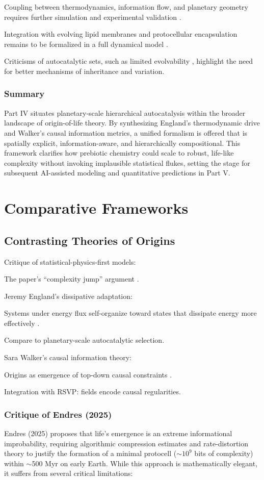 \documentclass{book}
\begin{document}
Coupling between thermodynamics, information flow, and planetary geometry requires further simulation and experimental validation \citep{plum2025}.

Integration with evolving lipid membranes and protocellular encapsulation remains to be formalized in a full dynamical model \citep{deamer2017}.

Criticisms of autocatalytic sets, such as limited evolvability \citep{vasas2010, lifson1997}, highlight the need for better mechanisms of inheritance and variation.

\section{Summary}
Part IV situates planetary-scale hierarchical autocatalysis within the broader landscape of origin-of-life theory. By synthesizing England’s thermodynamic drive and Walker’s causal information metrics, a unified formalism is offered that is spatially explicit, information-aware, and hierarchically compositional. This framework clarifies how prebiotic chemistry could scale to robust, life-like complexity without invoking implausible statistical flukes, setting the stage for subsequent AI-assisted modeling and quantitative predictions in Part V.

\part{Comparative Frameworks}

\chapter{Contrasting Theories of Origins}
Critique of statistical-physics-first models:

The paper’s “complexity jump” argument \citep{endres2025}.

Jeremy England’s dissipative adaptation:

Systems under energy flux self-organize toward states that dissipate energy more effectively \citep{england2013}.

Compare to planetary-scale autocatalytic selection.

Sara Walker’s causal information theory:

Origins as emergence of top-down causal constraints \citep{walker2013}.

Integration with RSVP: fields encode causal regularities.

\section{Critique of Endres (2025)}
Endres (2025) proposes that life’s emergence is an extreme informational improbability, requiring algorithmic compression estimates and rate-distortion theory to justify the formation of a minimal protocell ($\sim10^9$ bits of complexity) within $\sim$500 Myr on early Earth. While this approach is mathematically elegant, it suffers from several critical limitations:
\end{document}
